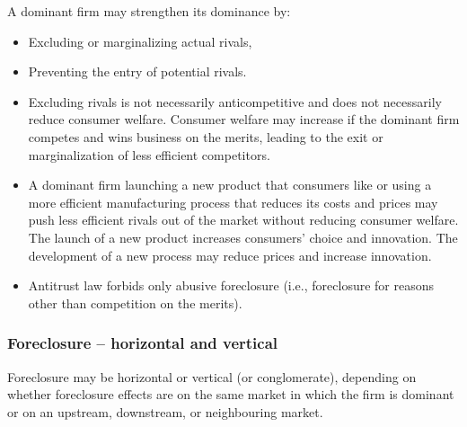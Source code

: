            A dominant firm may strengthen its dominance by:
            \begin{itemize}
                \item Excluding or marginalizing actual rivals,
                \item Preventing the entry of potential rivals.
            \end{itemize}
            
            \begin{itemize}
                \item Excluding rivals is not necessarily anticompetitive and does not necessarily reduce consumer welfare. Consumer welfare may increase if the dominant firm competes and wins business on the merits, leading to the exit or marginalization of less efficient competitors.
                \item A dominant firm launching a new product that consumers like or using a more efficient manufacturing process that reduces its costs and prices may push less efficient rivals out of the market without reducing consumer welfare. The launch of a new product increases consumers’ choice and innovation. The development of a new process may reduce prices and increase innovation.
                \item Antitrust law forbids only abusive foreclosure (i.e., foreclosure for reasons other than competition on the merits).
            \end{itemize}

        \subsubsection{Foreclosure – horizontal and vertical}

            Foreclosure may be horizontal or vertical (or conglomerate), depending on whether foreclosure effects are on the same market in which the firm is dominant or on an upstream, downstream, or neighbouring market.

